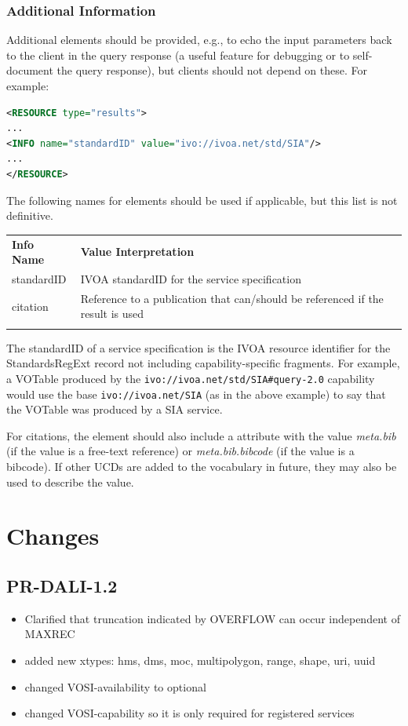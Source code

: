 \documentclass[11pt,letter]{ivoa}
\begin{document}
\subsubsection{Additional Information}
Additional  elements should be provided, e.g., to echo the input parameters
back to the client in the query response (a useful feature for debugging or to
self-document the query response), but clients should not depend on these. For
example:

\begin{lstlisting}[language=XML]
<RESOURCE type="results">
...
<INFO name="standardID" value="ivo://ivoa.net/std/SIA"/>
...
</RESOURCE>
\end{lstlisting}

The following names for  elements should be used if applicable, but this
list is not definitive.

\begin{tabular}{l p{8cm}}
\sptablerule
\textbf{Info Name}&\textbf{Value Interpretation}\\
\sptablerule
standardID & IVOA standardID for the service specification \\
citation & Reference to a publication that can/should be referenced if the
result is used \\
\sptablerule
\end{tabular}

The standardID of a service specification is the IVOA resource identifier for
the StandardsRegExt record not including capability-specific fragments. For example,
a VOTable produced by the \verb|ivo://ivoa.net/std/SIA#query-2.0| capability
would use the base \verb|ivo://ivoa.net/SIA| (as in the above example) to say that
the VOTable was produced by a SIA service.

For citations, the  element should also include a
 attribute with the
value \emph{meta.bib} (if the value is a free-text reference) or
\emph{meta.bib.bibcode} (if
the value is a bibcode). If other  UCDs are added to the vocabulary in
future, they may also be used to describe the value.

\appendix

\section{Changes}

\subsection{PR-DALI-1.2}
\begin{itemize}
\item Clarified that truncation indicated by OVERFLOW can occur independent of
MAXREC
\item added new xtypes: hms, dms, moc, multipolygon, range, shape, uri, uuid
\item changed VOSI-availability to optional
\item changed VOSI-capability so it is only required for registered services
\end{itemize}
\end{document}
